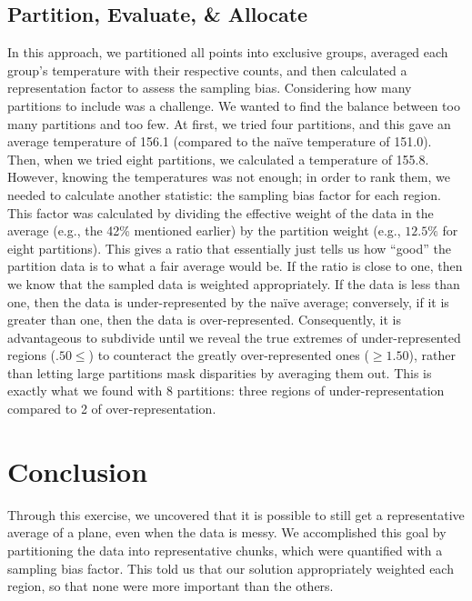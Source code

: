 \documentclass[12pt]{article}
\begin{document}
\subsection{Partition, Evaluate, \& Allocate}

In this approach, we partitioned all points into exclusive groups, averaged each group's temperature with their respective counts, and then calculated a representation factor to assess the sampling bias. Considering how many partitions to include was a challenge. We wanted to find the balance between too many partitions and too few. At first, we tried four partitions, and this gave an average temperature of 156.1 (compared to the naïve temperature of 151.0). Then, when we tried eight partitions, we calculated a temperature of 155.8. \\

However, knowing the temperatures was not enough; in order to rank them, we needed to calculate another statistic: the sampling bias factor for each region. This factor was calculated by dividing the effective weight of the data in the average (e.g., the 42\% mentioned earlier) by the partition weight (e.g., \(12.5\%\) for eight partitions). This gives a ratio that essentially just tells us how ``good'' the partition data is to what a fair average would be. If the ratio is close to one, then we know that the sampled data is weighted appropriately. If the data is less than one, then the data is under-represented by the naïve average; conversely, if it is greater than one, then the data is over-represented. Consequently, it is advantageous to subdivide until we reveal the true extremes of under-represented regions (\(.50 \le\)) to counteract the greatly over-represented ones (\(\ge 1.50\)), rather than letting large partitions mask disparities by averaging them out. This is exactly what we found with 8 partitions: three regions of under-representation compared to 2 of over-representation.

\section{Conclusion}

Through this exercise, we uncovered that it is possible to still get a representative average of a plane, even when the data is messy. We accomplished this goal by partitioning the data into representative chunks, which were quantified with a sampling bias factor. This told us that our solution appropriately weighted each region, so that none were more important than the others.
\end{document}
